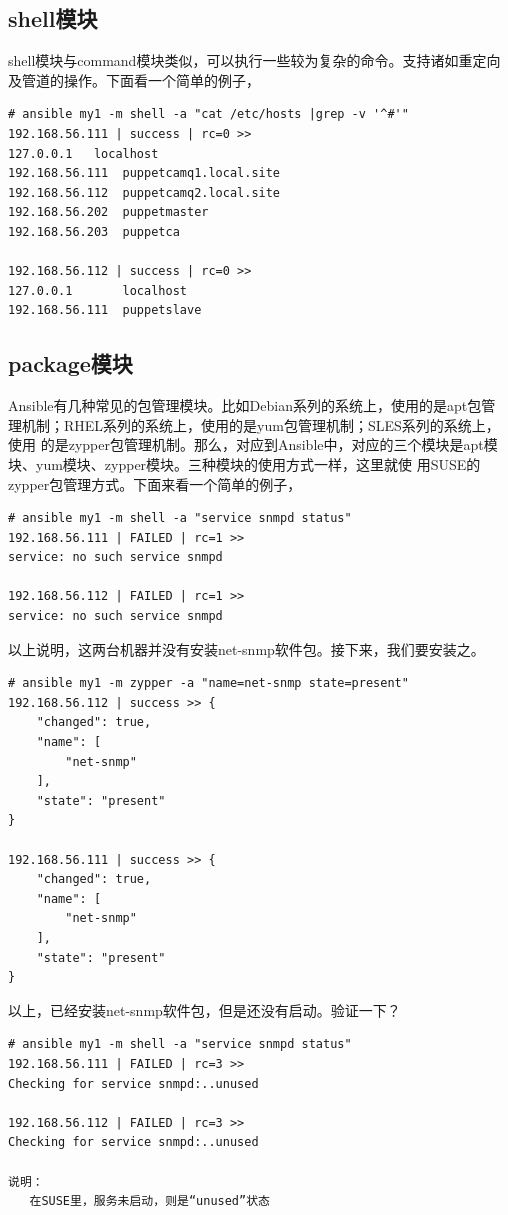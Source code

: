 \subsection{shell模块}
\label{sec:AnsibleShellMod}

shell模块与command模块类似，可以执行一些较为复杂的命令。支持诸如重定向
及管道的操作。下面看一个简单的例子，
\begin{verbatim}
# ansible my1 -m shell -a "cat /etc/hosts |grep -v '^#'"
192.168.56.111 | success | rc=0 >>
127.0.0.1	localhost 
192.168.56.111  puppetcamq1.local.site
192.168.56.112  puppetcamq2.local.site
192.168.56.202  puppetmaster
192.168.56.203  puppetca

192.168.56.112 | success | rc=0 >>
127.0.0.1	    localhost 
192.168.56.111	puppetslave
\end{verbatim}
\subsection{package模块}
\label{sec:AnsiblePackageMod}

Ansible有几种常见的包管理模块。比如Debian系列的系统上，使用的是apt包管
理机制；RHEL系列的系统上，使用的是yum包管理机制；SLES系列的系统上，使用
的是zypper包管理机制。那么，对应到Ansible中，对应的三个模块是apt模
块、yum模块、zypper模块。三种模块的使用方式一样，这里就使
用SUSE的zypper包管理方式。下面来看一个简单的例子，
\begin{verbatim}
# ansible my1 -m shell -a "service snmpd status"
192.168.56.111 | FAILED | rc=1 >>
service: no such service snmpd

192.168.56.112 | FAILED | rc=1 >>
service: no such service snmpd
\end{verbatim}
以上说明，这两台机器并没有安装net-snmp软件包。接下来，我们要安装之。
\begin{verbatim}
# ansible my1 -m zypper -a "name=net-snmp state=present"
192.168.56.112 | success >> {
    "changed": true, 
    "name": [
        "net-snmp"
    ], 
    "state": "present"
}

192.168.56.111 | success >> {
    "changed": true, 
    "name": [
        "net-snmp"
    ], 
    "state": "present"
}
\end{verbatim}
以上，已经安装net-snmp软件包，但是还没有启动。验证一下？
\begin{verbatim}
# ansible my1 -m shell -a "service snmpd status"
192.168.56.111 | FAILED | rc=3 >>
Checking for service snmpd:..unused

192.168.56.112 | FAILED | rc=3 >>
Checking for service snmpd:..unused

说明：
   在SUSE里，服务未启动，则是“unused”状态
\end{verbatim}

